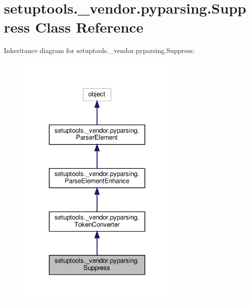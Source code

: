 \hypertarget{classsetuptools_1_1__vendor_1_1pyparsing_1_1Suppress}{}\section{setuptools.\+\_\+vendor.\+pyparsing.\+Suppress Class Reference}
\label{classsetuptools_1_1__vendor_1_1pyparsing_1_1Suppress}


Inheritance diagram for setuptools.\+\_\+vendor.\+pyparsing.\+Suppress\+:
\nopagebreak
\begin{figure}[H]
\begin{center}
\leavevmode
\includegraphics[width=227pt]{classsetuptools_1_1__vendor_1_1pyparsing_1_1Suppress__inherit__graph}
\end{center}
\end{figure}


